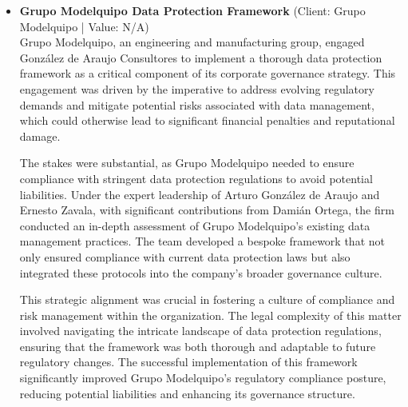 \documentclass[11pt]{article}
\begin{document}
\begin{itemize}
The outcome of this engagement was an improved compliance framework that effectively reduced Grupo Excelsior's regulatory exposure. This matter highlights González de Araujo Consultores' strategic role as a trusted advisor in data protection, showcasing their ability to integrate thorough data protection frameworks into the corporate governance of significant clients. The leadership and expertise of Arturo González de Araujo, Ernesto Zavala, and Damián Ortega in this complex matter underscore their commitment to excellence and their recognition in the field of data protection.
\item \textbf{Grupo Modelquipo Data Protection Framework} (Client: Grupo Modelquipo | Value: N/A)\\ Grupo Modelquipo, an engineering and manufacturing group, engaged González de Araujo Consultores to implement a thorough data protection framework as a critical component of its corporate governance strategy. This engagement was driven by the imperative to address evolving regulatory demands and mitigate potential risks associated with data management, which could otherwise lead to significant financial penalties and reputational damage.

The stakes were substantial, as Grupo Modelquipo needed to ensure compliance with stringent data protection regulations to avoid potential liabilities. Under the expert leadership of Arturo González de Araujo and Ernesto Zavala, with significant contributions from Damián Ortega, the firm conducted an in-depth assessment of Grupo Modelquipo's existing data management practices. The team developed a bespoke framework that not only ensured compliance with current data protection laws but also integrated these protocols into the company's broader governance culture.

This strategic alignment was crucial in fostering a culture of compliance and risk management within the organization. The legal complexity of this matter involved navigating the intricate landscape of data protection regulations, ensuring that the framework was both thorough and adaptable to future regulatory changes. The successful implementation of this framework significantly improved Grupo Modelquipo's regulatory compliance posture, reducing potential liabilities and enhancing its governance structure.


\end{itemize}
\end{document}
